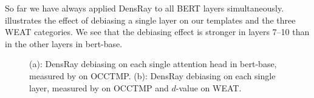 So far we have always applied DensRay to all BERT layers
simultaneously.   illustrates the effect of
debiasing a single  layer on our templates and the three
WEAT categories. We see that the debiasing effect is
stronger in layers 7--10 than in the other layers in
bert-base.
\begin{figure}[h]
	\centering
	\centering
	\caption{(a): DensRay debiasing on each single attention head in bert-base, measured by  on OCCTMP. (b): DensRay debiasing on each single layer, measured by  on  OCCTMP and $d$-value on WEAT.}
\end{figure}

